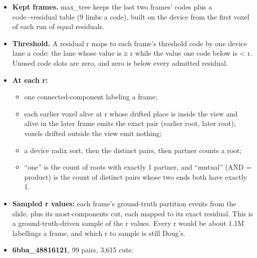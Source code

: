\begin{itemize}
\item \textbf{Kept frames.} max\_\allowbreak{}tree keeps the last two frames' codes plus a code→residual table (9 limbs a code), built on the device from the first voxel of each run of equal residuals.
\item \textbf{Threshold.} A residual r maps to each frame's threshold code by one device lane a code: the lane whose value is ≥ r while the value one code below is < r. Unused code slots are zero, and zero is below every admitted residual.
\item \textbf{At each r:}

\begin{itemize}
\item one connected-component labeling a frame;
\item each earlier voxel alive at r whose drifted place is inside the view and alive in the later frame emits the exact pair (earlier root, later root); voxels drifted outside the view emit nothing;
\item a device radix sort, then the distinct pairs, then partner counts a root;
\item “one” is the count of roots with exactly 1 partner, and “mutual” (AND = product) is the count of distinct pairs whose two ends both have exactly 1.
\end{itemize}
\item \textbf{Sampled r values:} each frame's ground-truth partition events from the slide, plus its most-components cut, each mapped to its exact residual. This is a ground-truth-driven sample of the r values. Every r would be about 1.1M labellings a frame, and which r to sample is still Doug's.
\item \textbf{6bba\_\allowbreak{}48816121}, 99 pairs, 3,615 cuts:


\end{itemize}
